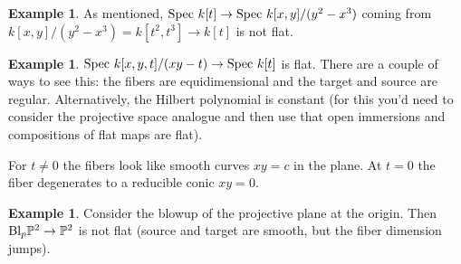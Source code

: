\documentclass[10pt,reqno]{amsart}
\theoremstyle{definition}
\newtheorem{example}[theorem]{Example}
\theoremstyle{remark}
\numberwithin{equation}{section}
\numberwithin{theorem}{section}
\newcommand{\spec}{\textup{Spec }}
\newcommand{\Bl}{\textup{Bl}}
\newcommand{\PP}{{\mathbb P}}
\begin{document}
\begin{example} As mentioned, $\spec k[t] \to \spec k[x,y]/(y^2-x^3)$ coming from $k[x,y]/(y^2-x^3) = k[t^2,t^3] \to k[t]$ is not flat. 
\end{example}

\begin{example} $\spec k[x,y,t]/(xy-t) \to \spec k[t]$ is flat. There are a couple of ways to see this: the fibers are equidimensional and the target and source are regular. Alternatively, the Hilbert polynomial is constant (for this you'd need to consider the projective space analogue and then use that open immersions and compositions of flat maps are flat). 

For $t\ne 0$ the fibers look like smooth curves $xy = c$ in the plane. At $t=0$ the fiber degenerates to a reducible conic $xy = 0$.
\end{example} 

\begin{example} Consider the blowup of the projective plane at the origin. Then $\Bl_p \PP^2 \to \PP^2$ is not flat (source and target are smooth, but the fiber dimension jumps).
\end{example}
\end{document}
